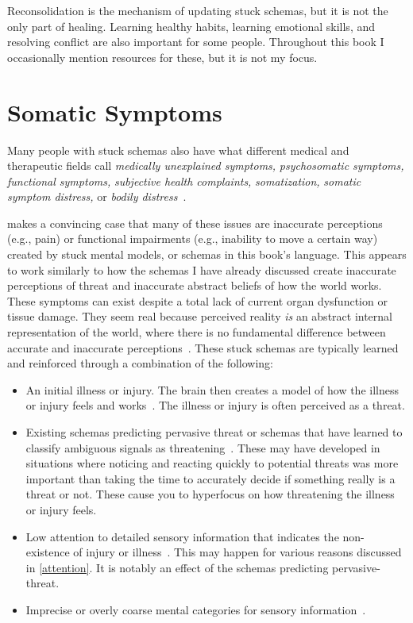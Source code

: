 \documentclass[11pt,oneside]{book}
\let\cite\parencite
\begin{document}
Reconsolidation is the mechanism of updating stuck schemas, but it is not the only part of healing. Learning healthy habits, learning emotional skills, and resolving conflict are also important for some people. Throughout this book I occasionally mention resources for these, but it is not my focus.

\section{Somatic Symptoms}
\label{psychogenic}
Many people with stuck schemas also have what different medical and therapeutic fields call \textit{medically unexplained symptoms,} \textit{psychosomatic symptoms,} \textit{functional symptoms,} \textit{subjective health complaints,} \textit{somatization,} \textit{somatic symptom distress,} or \textit{bodily distress}~\cite{berghPsychogenic}.

\textcite{berghPsychogenic} makes a convincing case that many of these issues are inaccurate perceptions (e.g., pain) or functional impairments (e.g., inability to move a certain way) created by stuck mental models, or schemas in this book's language. This appears to work similarly to how the schemas I have already discussed create inaccurate perceptions of threat and inaccurate abstract beliefs of how the world works. These symptoms can exist despite a total lack of current organ dysfunction or tissue damage. They seem real because perceived reality \textit{is} an abstract internal representation of the world, where there is no fundamental difference between accurate and inaccurate perceptions~\cite{clark2015surfing}. These stuck schemas are typically learned and reinforced through a combination of the following:
\begin{itemize}
    \item An initial illness or injury. The brain then creates a model of how the illness or injury feels and works~\cite{berghPsychogenic}. The illness or injury is often perceived as a threat.
    \item Existing schemas predicting pervasive threat or schemas that have learned to classify ambiguous signals as threatening~\cite{berghBSTS}. These may have developed in situations where noticing and reacting quickly to potential threats was more important than taking the time to accurately decide if something really is a threat or not. These cause you to hyperfocus on how threatening the illness or injury feels.
    \item Low attention to detailed sensory information that indicates the non-existence of injury or illness~\cite{berghBSTS}. This may happen for various reasons discussed in \cref{attention}. It is notably an effect of the schemas predicting pervasive-threat.
    \item Imprecise or overly coarse mental categories for sensory information~\cite{berghPsychogenic}.
\end{itemize}
\end{document}
